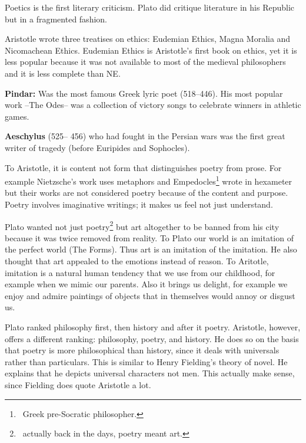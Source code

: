 \documentclass[12pt, a4paper]{article}
\begin{document}

Poetics is the first literary criticism. Plato did critique literature in his Republic but in a fragmented 
fashion.


Aristotle wrote three treatises on ethics: Eudemian Ethics, Magna Moralia and Nicomachean Ethics.
Eudemian Ethics is Aristotle's first book on ethics, yet it is less popular because
it was not available to most of the medieval philosophers and it is less complete than 
NE.\medbreak

\textbf{Pindar:} Was the most famous Greek lyric poet (518–446). His most popular work
--The Odes-- was a collection of victory songs
to celebrate winners in athletic games.\medbreak

\textbf{Aeschylus} (525– 456) who had fought in the Persian wars
was the first great writer of tragedy (before Euripides and Sophocles).\medbreak


To Aristotle, it is content not form that distinguishes poetry from prose. For example Nietzsche's 
work uses metaphors and Empedocles\footnote{\, Greek pre-Socratic philosopher.}
wrote in hexameter but their works are not considered poetry
because of the content and purpose. Poetry involves imaginative writings; it makes us feel not just understand.


Plato wanted not just poetry\footnote{\, actually back in the days, poetry meant art.}
but art altogether to be banned from his city because it was twice removed from reality.
To Plato our world is an imitation of the perfect world (The Forms). Thus art is an imitation
of the imitation. He also thought that art appealed to the emotions instead of reason. 
To Aritotle, imitation is a natural human tendency that we use from our childhood, for example
when we mimic our parents. Also it brings us delight, for example we enjoy and admire paintings of 
objects that in themselves would annoy or disgust us.

Plato ranked philosophy first, then history and after it poetry.
Aristotle, however, offers a different ranking: philosophy, poetry, and history. He
does so on the basis that poetry is more philosophical than history, since it
deals with universals rather than particulars. This is similar to Henry Fielding's
theory of novel. He explains that he depicts universal characters 
not men. This actually make sense, since Fielding does quote Aristotle a lot.
\end{document}
